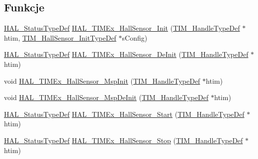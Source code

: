\subsection*{Funkcje}
\begin{DoxyCompactItemize}
\item 
\hyperlink{stm32f4xx__hal__def_8h_a63c0679d1cb8b8c684fbb0632743478f}{H\+A\+L\+\_\+\+Status\+Type\+Def} \hyperlink{group___t_i_m_ex___exported___functions___group1_ga9edc6a00a673eb7c07b0c3cf86a95169}{H\+A\+L\+\_\+\+T\+I\+M\+Ex\+\_\+\+Hall\+Sensor\+\_\+\+Init} (\hyperlink{struct_t_i_m___handle_type_def}{T\+I\+M\+\_\+\+Handle\+Type\+Def} $\ast$htim, \hyperlink{struct_t_i_m___hall_sensor___init_type_def}{T\+I\+M\+\_\+\+Hall\+Sensor\+\_\+\+Init\+Type\+Def} $\ast$s\+Config)
\item 
\hyperlink{stm32f4xx__hal__def_8h_a63c0679d1cb8b8c684fbb0632743478f}{H\+A\+L\+\_\+\+Status\+Type\+Def} \hyperlink{group___t_i_m_ex___exported___functions___group1_ga61f3c18eb8fe53b65b55ec855072631d}{H\+A\+L\+\_\+\+T\+I\+M\+Ex\+\_\+\+Hall\+Sensor\+\_\+\+De\+Init} (\hyperlink{struct_t_i_m___handle_type_def}{T\+I\+M\+\_\+\+Handle\+Type\+Def} $\ast$htim)
\item 
void \hyperlink{group___t_i_m_ex___exported___functions___group1_ga88d9e7c4bc86e1a1190fda06e04552ea}{H\+A\+L\+\_\+\+T\+I\+M\+Ex\+\_\+\+Hall\+Sensor\+\_\+\+Msp\+Init} (\hyperlink{struct_t_i_m___handle_type_def}{T\+I\+M\+\_\+\+Handle\+Type\+Def} $\ast$htim)
\item 
void \hyperlink{group___t_i_m_ex___exported___functions___group1_gac19734439bdfa549b7fb5d85f3c0720d}{H\+A\+L\+\_\+\+T\+I\+M\+Ex\+\_\+\+Hall\+Sensor\+\_\+\+Msp\+De\+Init} (\hyperlink{struct_t_i_m___handle_type_def}{T\+I\+M\+\_\+\+Handle\+Type\+Def} $\ast$htim)
\item 
\hyperlink{stm32f4xx__hal__def_8h_a63c0679d1cb8b8c684fbb0632743478f}{H\+A\+L\+\_\+\+Status\+Type\+Def} \hyperlink{group___t_i_m_ex___exported___functions___group1_ga9f4bfa2a4b890a2219ca927bbbb455fc}{H\+A\+L\+\_\+\+T\+I\+M\+Ex\+\_\+\+Hall\+Sensor\+\_\+\+Start} (\hyperlink{struct_t_i_m___handle_type_def}{T\+I\+M\+\_\+\+Handle\+Type\+Def} $\ast$htim)
\item 
\hyperlink{stm32f4xx__hal__def_8h_a63c0679d1cb8b8c684fbb0632743478f}{H\+A\+L\+\_\+\+Status\+Type\+Def} \hyperlink{group___t_i_m_ex___exported___functions___group1_ga714c2a7a51f4ab61b04df84ab182eb86}{H\+A\+L\+\_\+\+T\+I\+M\+Ex\+\_\+\+Hall\+Sensor\+\_\+\+Stop} (\hyperlink{struct_t_i_m___handle_type_def}{T\+I\+M\+\_\+\+Handle\+Type\+Def} $\ast$htim)
\item 

\end{DoxyCompactItemize}
